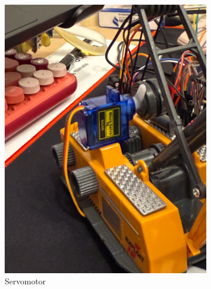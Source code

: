 \begin{figure}[h!]
  \begin{subfigure}[b]{0.3\textwidth} %
      \includegraphics[width=\textwidth]{figures/4.jpg}
      \caption{Servomotor}
  \end{subfigure}
  \hfill
  \begin{subfigure}[b]{0.3\textwidth} %

\end{subfigure}
\end{figure}
